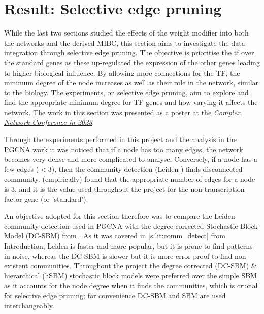 \section{Result: Selective edge pruning} \label{s:N_I:sel_pruning}

While the last two sections studied the effects of the weight modifier into both the networks and the derived MIBC, this section aims to investigate the data integration through selective edge pruning. The objective is prioritise the \acrfull{tf} over the standard genes as these up-regulated the expression of the other genes leading to higher biological influence. By allowing more connections for the TF, the minimum degree of the node increases as well as their role in the network, similar to the biology. The experiments, on selective edge pruning, aim to explore and find the appropriate minimum degree for TF genes and how varying it affects the network. The work in this section was presented as a poster at the \textit{\href{https://2023.complexnetworks.org/}{Complex Network Conference in 2023}}.

Through the experiments performed in this project and the analysis in the PGCNA work \citep{Care2019-ij} it was noticed that if a node has too many edges, the network becomes very dense and more complicated to analyse. Conversely, if a node has a few edges ($<3$), then the community detection (Leiden \cite{Traag2019-ne}) finds disconnected community. \citet{Care2019-ij} (empirically) found that the appropriate number of edges for a node is 3, and it is the value used throughout the project for the non-transcription factor gene (or 'standard'). 

An objective adopted for this section therefore was to compare the Leiden \citep{Traag2019-ne} community detection used in PGCNA with the degree corrected Stochastic Block Model (DC-SBM) from \citet{Karrer2011-si, Peixoto2017-gc}. As it was covered in \cref{s:lit:comm_detect} from Introduction, Leiden is faster and more popular, but it is prone to find patterns in noise, whereas the DC-SBM is slower but it is more error proof to find non-existent communities. Throughout the project the degree corrected (DC-SBM) \& hierarchical (hSBM) stochastic block models were preferred over the simple SBM \citep{Holland1983-eu} as it accounts for the node degree when it finds the communities, which is crucial for selective edge pruning; for convenience DC-SBM and SBM are used interchangeably.


